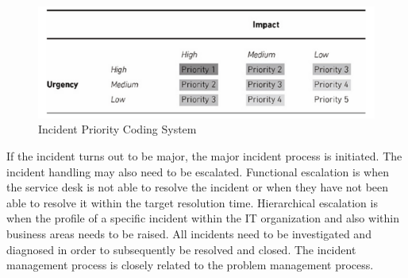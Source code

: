 \begin{figure}[ht]
\begin{center}
\hspace{-0.2cm}\includegraphics[scale=0.4]{ITILIncidentPrioritization.png}
\caption[ITIL Incident Priority Coding System]{Incident Priority Coding System \cite{itilbok}}
\label{fig:ITILIncidentPrioritization}
\end{center}
\end{figure}

If the incident turns out to be major, the major incident process is initiated. The incident handling may also need to be escalated. Functional escalation is when the service desk is not able to resolve the incident or when they have not been able to resolve it within the target resolution time. Hierarchical escalation is when the profile of a specific incident within the IT organization and also within business areas needs to be raised. All incidents need to be investigated and diagnosed in order to subsequently be resolved and closed. The incident management process is closely related to the problem management process.


